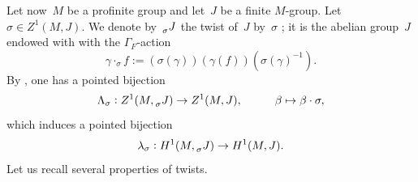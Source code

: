 \documentclass[a4paper,english,12pt]{amsart}
\newcommand{\sJ}{\prescript{}{\sigma}J}
\numberwithin{equation}{subsection}
\begin{document}
\subsubsection{}\label{paragtwist} Let now~$M$ be a profinite group and let~$J$ be a finite $M$-group. Let $\sigma\in Z^1(M, J)$. We denote by~$\prescript{}{\sigma}J$ the twist of~$J$ by~$\sigma$ \cite[Section 5.4, Example 2]{Cohomologiegalois}; it is the abelian group~$J$ endowed with with the $\Gamma_F$-action $$\gamma\cdot_{\sigma} f:=(\sigma(\gamma))(\gamma(f))(\sigma(\gamma)^{-1}).$$ 
By \cite[Chapter II, Proposition 35 bis]{Cohomologiegalois}, one has a pointed bijection $$\Lambda_{\sigma}:Z^1(M, \sJ)\to Z^1(M, J),\hspace{1cm}\beta\mapsto \beta\cdot\sigma,$$ which induces a pointed bijection $$\lambda_{\sigma}:H^1(M, \sJ)\to H^1(M, J).$$
Let us recall several properties of twists.
\end{document}
